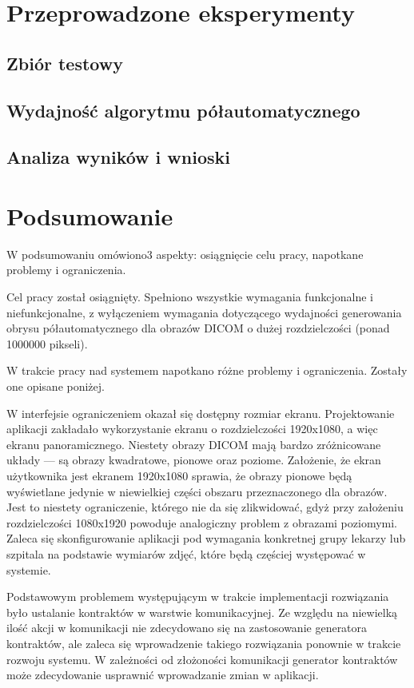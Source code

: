 \documentclass[a4paper,11pt,twoside,openright]{report}
\theoremstyle{definition}
\begin{document}
\chapter {Przeprowadzone eksperymenty}

\section {Zbiór testowy}

\section {Wydajność algorytmu półautomatycznego}

\section {Analiza wyników i wnioski}


\chapter {Podsumowanie}

W podsumowaniu omówiono3 aspekty: osiągnięcie celu pracy, napotkane problemy i ograniczenia.

Cel pracy został osiągnięty. Spełniono wszystkie wymagania funkcjonalne i niefunkcjonalne, z wyłączeniem wymagania dotyczącego wydajności generowania obrysu półautomatycznego dla obrazów DICOM o dużej rozdzielczości (ponad 1000000 pikseli).

W trakcie pracy nad systemem napotkano różne problemy i ograniczenia. Zostały one opisane poniżej.

W interfejsie ograniczeniem okazał się dostępny rozmiar ekranu. Projektowanie aplikacji zakładało wykorzystanie ekranu o rozdzielczości 1920x1080, a więc ekranu panoramicznego. Niestety obrazy DICOM mają bardzo zróżnicowane układy --- są obrazy kwadratowe, pionowe oraz poziome. Założenie, że ekran użytkownika jest ekranem 1920x1080 sprawia, że obrazy pionowe będą wyświetlane jedynie w niewielkiej części obszaru przeznaczonego dla obrazów. Jest to niestety ograniczenie, którego nie da się zlikwidować, gdyż przy założeniu rozdzielczości 1080x1920 powoduje analogiczny problem z obrazami poziomymi. Zaleca się skonfigurowanie aplikacji pod wymagania konkretnej grupy lekarzy lub szpitala na podstawie wymiarów zdjęć, które będą częściej występować w systemie.


Podstawowym problemem występującym w trakcie implementacji rozwiązania było ustalanie kontraktów w warstwie komunikacyjnej. Ze względu na niewielką ilość akcji w komunikacji nie zdecydowano się na zastosowanie generatora kontraktów, ale zaleca się wprowadzenie takiego rozwiązania ponownie w trakcie rozwoju systemu. W zależności od złożoności komunikacji generator kontraktów może zdecydowanie usprawnić wprowadzanie zmian w aplikacji.
\end{document}
